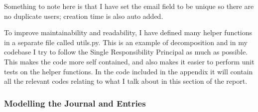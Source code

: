 Something to note here is that I have set the email field to be unique so there are no duplicate users; creation time is also auto added.

To improve maintainability and readability, I have defined many helper functions in a separate file called utils.py. This is an example of decomposition and in my codebase I try to follow the Single Responsibility Principal as much as possible. This makes the code more self contained, and also makes it easier to perform unit tests on the helper functions. In the code included in the appendix it will contain all the relevant codes relating to what I talk about in this section of the report.


\subsubsection{Modelling the Journal and Entries}
